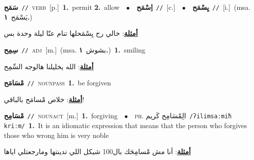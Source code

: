 \documentclass[10pt,a4paper,twoside]{article} %
\begin{document}
\begin{multicols}{2}
{\setlength\topsep{0pt}\textbf{\foreignlanguage{arabic}{سَمَح}}\ {\color{gray}\texttt{//}\color{black}}\ \textsc{verb}\ [p.]\ \textbf{1.}~permit  \textbf{2.}~allow\ \ $\bullet$\ \ \setlength\topsep{0pt}\textbf{\foreignlanguage{arabic}{اِسْمَح}}\ {\color{gray}\texttt{//}\color{black}}\ [c.]\ \ $\bullet$\ \ \setlength\topsep{0pt}\textbf{\foreignlanguage{arabic}{يِسْمَح}}\ {\color{gray}\texttt{//}\color{black}}\ [i.]\ \color{gray}(msa. \foreignlanguage{arabic}{يَسْمَح}~\foreignlanguage{arabic}{\textbf{١.}})\color{black}\  \begin{flushright}\color{gray}\foreignlanguage{arabic}{\textbf{\underline{\foreignlanguage{arabic}{أمثلة}}}: خالي رح يِسْمَحلها تنام عنّا ليلة وحدة بس}\end{flushright}\color{black}} \vspace{2mm}

{\setlength\topsep{0pt}\textbf{\foreignlanguage{arabic}{سِمِح}}\ {\color{gray}\texttt{//}\color{black}}\ \textsc{adj}\ [m.]\ \color{gray}(msa. \foreignlanguage{arabic}{بشوش}~\foreignlanguage{arabic}{\textbf{١.}})\color{black}\ \textbf{1.}~smiling\  \begin{flushright}\color{gray}\foreignlanguage{arabic}{\textbf{\underline{\foreignlanguage{arabic}{أمثلة}}}: الله يخليلنا هالوجه السِّمِح}\end{flushright}\color{black}} \vspace{2mm}

{\setlength\topsep{0pt}\textbf{\foreignlanguage{arabic}{مْسَامَح}}\ {\color{gray}\texttt{//}\color{black}}\ \textsc{noun\textunderscore pass}\ \textbf{1.}~be forgiven\  \begin{flushright}\color{gray}\foreignlanguage{arabic}{\textbf{\underline{\foreignlanguage{arabic}{أمثلة}}}: خلاص مْسامَح بالباقي!}\end{flushright}\color{black}} \vspace{2mm}

{\setlength\topsep{0pt}\textbf{\foreignlanguage{arabic}{مْسَامِح}}\ {\color{gray}\texttt{//}\color{black}}\ \textsc{noun\textunderscore act}\ [m.]\ \textbf{1.}~forgiving\ \ $\bullet$\ \ \textsc{ph.} \color{gray} \foreignlanguage{arabic}{الِمْسَامِح كَريم}\color{black}\ {\color{gray}\texttt{/{\sffamily ʔilimsaːmiħ kriːm}/}\color{black}}\ \textbf{1.}~It is an idiomatic expression that means that the person who forgives those who wrong him is very noble\  \begin{flushright}\color{gray}\foreignlanguage{arabic}{\textbf{\underline{\foreignlanguage{arabic}{أمثلة}}}: أنا مش مْسامِحَك بال100 شيكل اللي تدينتها ومارجعتلي اياها}\end{flushright}\color{black}} \vspace{2mm}


\end{multicols}
\end{document}
